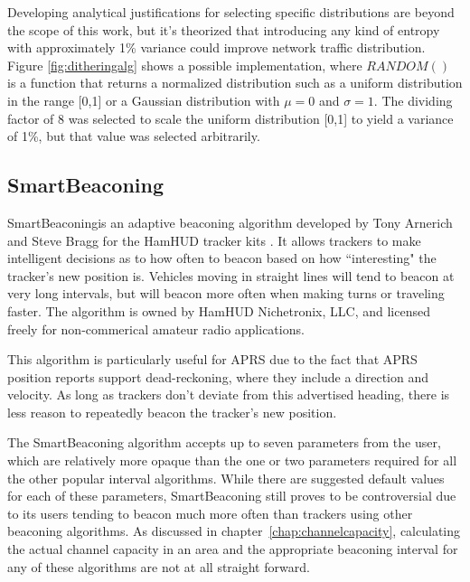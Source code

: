 Developing analytical justifications for selecting specific distributions
are beyond the scope of this work, but it's theorized that introducing
any kind of entropy with approximately 1\% variance could improve network
traffic distribution.
Figure \ref{fig:ditheringalg} shows a possible implementation, where $RANDOM()$
is a function that returns a normalized distribution such as 
a uniform distribution in the range [0,1] 
or a Gaussian distribution with $\mu=0$ and $\sigma=1$.
The dividing factor of 8 was selected to scale the uniform distribution [0,1]
to yield a variance of 1\%, but that value was selected arbitrarily.

\subsection{SmartBeaconing}

SmartBeaconing\texttrademark is an adaptive beaconing algorithm developed
by Tony Arnerich and Steve Bragg for the HamHUD tracker kits \cite{smartbeacon}.
It allows trackers to make intelligent decisions as to how often to beacon
based on how ``interesting" the tracker's new position is. 
Vehicles moving in straight lines will tend to beacon at very long intervals,
but will beacon more often when making turns or traveling faster.
The algorithm is owned by HamHUD Nichetronix, LLC, and licensed freely
for non-commerical amateur radio applications.

This algorithm is particularly useful for APRS due to the fact that APRS
position reports support dead-reckoning, where they include a direction and 
velocity.
As long as trackers don't deviate from this advertised heading, there is
less reason to repeatedly beacon the tracker's new position.

The SmartBeaconing algorithm accepts up to seven parameters 
from the user\cite{smartbeaconwiki},
which are relatively more opaque than the one or two parameters required for
all the other popular interval algorithms. 
While there are suggested default values for each of these parameters, 
SmartBeaconing still proves to be controversial due to its users tending to
beacon much more often than 
trackers using other beaconing algorithms\cite{smartbeaconemail1}.
As discussed in chapter~\ref{chap:channelcapacity}, calculating the 
actual channel capacity in an area and the appropriate beaconing interval
for any of these algorithms are not at all straight forward.


